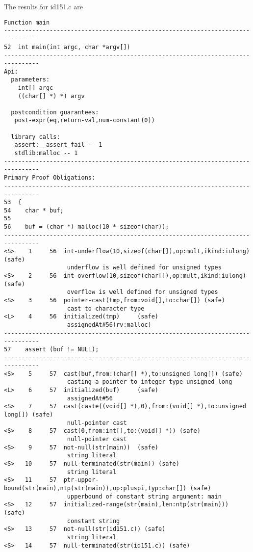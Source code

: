 \documentclass[11pt]{article}
\begin{document}
The results for id151.c are
\begin{scriptsize}
\begin{verbatim}
Function main
--------------------------------------------------------------------------------
52  int main(int argc, char *argv[])
--------------------------------------------------------------------------------
Api:
  parameters:
    int[] argc
    ((char[] *) *) argv

  postcondition guarantees:
   post-expr(eq,return-val,num-constant(0))

  library calls:
   assert:__assert_fail -- 1
   stdlib:malloc -- 1
--------------------------------------------------------------------------------
Primary Proof Obligations:
--------------------------------------------------------------------------------
53  {
54    char * buf;
55
56    buf = (char *) malloc(10 * sizeof(char));
--------------------------------------------------------------------------------
<S>    1     56  int-underflow(10,sizeof(char[]),op:mult,ikind:iulong) (safe)
                  underflow is well defined for unsigned types
<S>    2     56  int-overflow(10,sizeof(char[]),op:mult,ikind:iulong) (safe)
                  overflow is well defined for unsigned types
<S>    3     56  pointer-cast(tmp,from:void[],to:char[]) (safe)
                  cast to character type
<L>    4     56  initialized(tmp)     (safe)
                  assignedAt#56(rv:malloc)
--------------------------------------------------------------------------------
57    assert (buf != NULL);
--------------------------------------------------------------------------------
<S>    5     57  cast(buf,from:(char[] *),to:unsigned long[]) (safe)
                  casting a pointer to integer type unsigned long
<L>    6     57  initialized(buf)     (safe)
                  assignedAt#56
<S>    7     57  cast(caste((void[] *),0),from:(void[] *),to:unsigned long[]) (safe)
                  null-pointer cast
<S>    8     57  cast(0,from:int[],to:(void[] *)) (safe)
                  null-pointer cast
<S>    9     57  not-null(str(main))  (safe)
                  string literal
<S>   10     57  null-terminated(str(main)) (safe)
                  string literal
<S>   11     57  ptr-upper-bound(str(main),ntp(str(main)),op:pluspi,typ:char[]) (safe)
                  upperbound of constant string argument: main
<S>   12     57  initialized-range(str(main),len:ntp(str(main))) (safe)
                  constant string
<S>   13     57  not-null(str(id151.c)) (safe)
                  string literal
<S>   14     57  null-terminated(str(id151.c)) (safe)

\end{verbatim}
\end{scriptsize}
\end{document}
